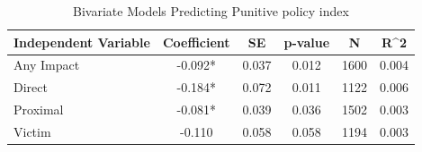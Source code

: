 \begin{table}

\caption{\label{tab:tab:prisonpen_bivariate}Bivariate Models Predicting Punitive policy index}
\centering
\begin{tabular}[t]{lccccc}
\toprule
Independent Variable & Coefficient & SE & p-value & N & R\textasciicircum{}2\\
\midrule
Any Impact & -0.092* & 0.037 & 0.012 & 1600 & 0.004\\
Direct & -0.184* & 0.072 & 0.011 & 1122 & 0.006\\
Proximal & -0.081* & 0.039 & 0.036 & 1502 & 0.003\\
Victim & -0.110 & 0.058 & 0.058 & 1194 & 0.003\\
\bottomrule
\end{tabular}
\end{table}
